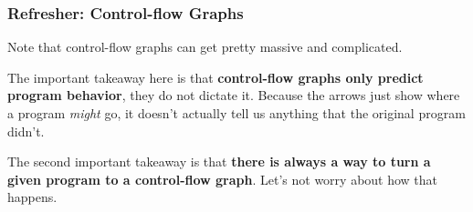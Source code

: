 \documentclass[aspectratio=169, handout]{beamer}
\begin{document}
 \begin{frame}[fragile]
   \frametitle{Refresher: Control-flow Graphs}

   Note that control-flow graphs can get pretty massive and complicated.

   \vspace{\fill}

   The important takeaway here is that \textbf{control-flow graphs only predict
   program behavior}, they do not dictate it. Because the arrows just show where
   a program \textit{might} go, it doesn't actually tell us anything that the
   original program didn't.

   \vspace{\fill}

   The second important takeaway is that \textbf{there is always a way to turn a
   given program to a control-flow graph}. Let's not worry about how that happens.
 \end{frame}
\end{document}
